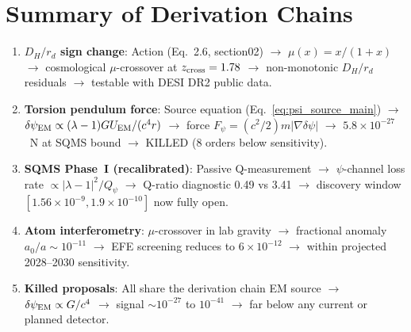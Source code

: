 \documentclass[11pt]{article}
\newcommand{\ee}[1]{\times 10^{#1}}
\newcommand{\dpsi}{\delta\psi}
\begin{document}
\section*{Summary of Derivation Chains}

\begin{enumerate}
\item \textbf{$D_H/r_d$ sign change}: Action (Eq.~2.6, section02)
  $\to$ $\mu(x) = x/(1+x)$ $\to$ cosmological $\mu$-crossover at
  $z_{\rm cross} = 1.78$ $\to$ non-monotonic $D_H/r_d$ residuals $\to$
  testable with DESI DR2 public data.

\item \textbf{Torsion pendulum force}: Source equation
  (Eq.~\ref{eq:psi_source_main}) $\to$ $\dpsi_{\rm EM} \propto
  (\lambda-1) G U_{\rm EM}/(c^4 r)$ $\to$ force
  $F_\psi = (c^2/2) m |\nabla\dpsi|$ $\to$ $5.8\ee{-27}$~N at
  SQMS bound $\to$ KILLED (8 orders below sensitivity).

\item \textbf{SQMS Phase~I (recalibrated)}: Passive Q-measurement $\to$
  $\psi$-channel loss rate $\propto |\lambda-1|^2 / Q_\psi$ $\to$
  Q-ratio diagnostic 0.49 vs 3.41 $\to$ discovery window
  $[1.56\ee{-9}, 1.9\ee{-10}]$ now fully open.

\item \textbf{Atom interferometry}: $\mu$-crossover in lab gravity
  $\to$ fractional anomaly $a_0/a \sim 10^{-11}$ $\to$ EFE screening
  reduces to $6\ee{-12}$ $\to$ within projected 2028--2030 sensitivity.

\item \textbf{Killed proposals}: All share the derivation chain
  EM source $\to$ $\dpsi_{\rm EM} \propto G/c^4$ $\to$ signal
  $\sim 10^{-27}$ to $10^{-41}$ $\to$ far below any current or
  planned detector.
\end{enumerate}
\end{document}
